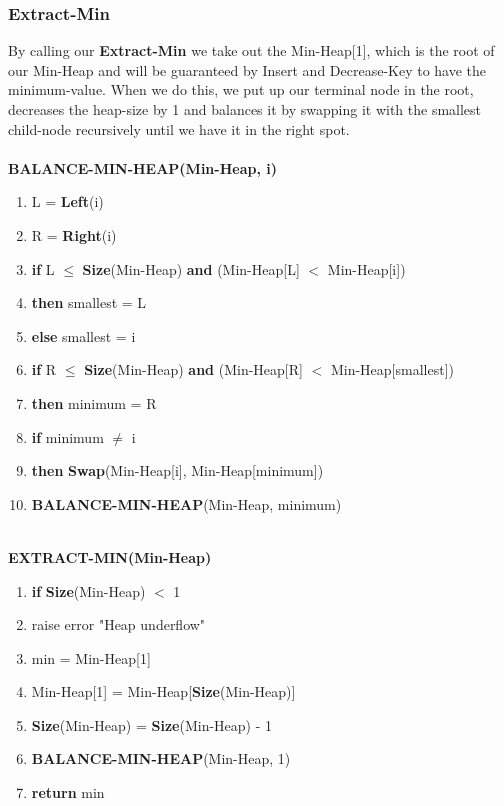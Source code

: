 \documentclass[11pt]{article}
\begin{document}
\subsubsection{Extract-Min}
By calling our \textbf{Extract-Min} we take out the Min-Heap[1], which is the root of our Min-Heap and will be guaranteed by Insert and Decrease-Key to have the minimum-value. When we do this, we put up our terminal node in the root, decreases the heap-size by 1 and balances it by swapping it with the smallest child-node recursively until we have it in the right spot.\\\\
\textbf{BALANCE-MIN-HEAP(Min-Heap, i)}
\begin{enumerate}
\setlength\itemsep{0em}
\item L = \textbf{Left}(i)
\item R = \textbf{Right}(i)
\item \textbf{if } L $\leq$ \textbf{Size}(Min-Heap) \textbf{and} (Min-Heap[L] $<$ Min-Heap[i])
\item \tab \textbf{then } smallest = L
\item \tab \textbf{else } smallest = i
\item \textbf{if } R $\leq$ \textbf{Size}(Min-Heap) \textbf{and} (Min-Heap[R] $<$ Min-Heap[smallest])
\item \tab \textbf{then } minimum = R
\item \textbf{if } minimum $\neq$ i
\item \tab \textbf{then } \textbf{Swap}(Min-Heap[i], Min-Heap[minimum])
\item \tab \tab \textbf{BALANCE-MIN-HEAP}(Min-Heap, minimum)
\end{enumerate}
\  \\
\textbf{EXTRACT-MIN(Min-Heap)}
\begin{enumerate}
\setlength\itemsep{0em}
\item \textbf{if } \textbf{Size}(Min-Heap) $<$ 1
\item \tab raise error "Heap underflow"
\item min = Min-Heap[1]
\item Min-Heap[1] = Min-Heap[\textbf{Size}(Min-Heap)]
\item \textbf{Size}(Min-Heap) = \textbf{Size}(Min-Heap) - 1
\item \textbf{BALANCE-MIN-HEAP}(Min-Heap, 1)
\item \textbf{return} min
\end{enumerate}
\  \\
\end{document}
